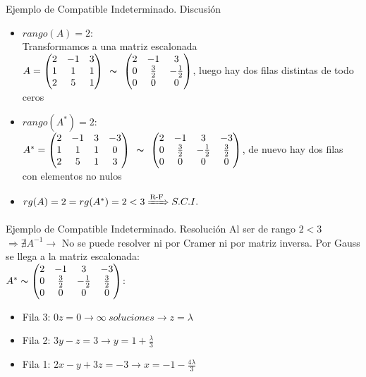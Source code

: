 \documentclass[11pt]{beamer}
\begin{document}
\begin{frame}{Ejemplo de Compatible Indeterminado. Discusión}
\begin{itemize}[<+->]
    \item $rango(A) =2$: \\ Transformamos a una matriz escalonada \\
    $A=\left(\begin{matrix}2 & -1 & 3\\1 & 1 & 1\\2 & 5 & 1\end{matrix}\right) \begin{array}{c}
     \thicksim   \\
     \end{array}
 \left(\begin{matrix}2 & -1 & 3\\0 & \frac{3}{2} & - \frac{1}{2}\\0 & 0 & 0\end{matrix}\right) $, luego hay dos filas distintas de todo ceros
    \item $rango(A^*) =2$: \\
    $A^*=\left(\begin{matrix}2 & -1 & 3 & -3\\1 & 1 & 1 & 0\\2 & 5 & 1 & 3\end{matrix}\right)\begin{array}{c}
     \thicksim   \\
    \end{array}
    \left(\begin{matrix}2 & -1 & 3 & -3\\0 & \frac{3}{2} & - \frac{1}{2} & \frac{3}{2}\\0 & 0 & 0 & 0\end{matrix}\right)$, de nuevo hay dos filas con elementos no nulos 
    \item $rg(A)=2 = rg(A^*)=2 < 3 \xRightarrow{\text{R-F}} S.C.I. $
\end{itemize}
    
\end{frame}

\begin{frame}{Ejemplo de Compatible Indeterminado. Resolución}
    Al ser de rango $2 < 3$ $\Rightarrow \nexists A^{-1} \to$ No se puede resolver ni por Cramer ni por matriz inversa.
Por Gauss se llega a la matriz escalonada: \\ $A^* \thicksim \left(\begin{matrix}2 & -1 & 3 & -3\\0 & \frac{3}{2} & - \frac{1}{2} & \frac{3}{2}\\0 & 0 & 0 & 0\end{matrix}\right)$:

\begin{itemize}[<+->]
    \item Fila 3: $0z=0 \to \infty  \ soluciones \to z = \lambda$
    \item Fila 2: $3y-z=3 \to y= 1+\frac{\lambda}{3}$
    \item Fila 1: $2x-y+3z=-3 \to x= -1 - \frac{4\lambda}{3} $
\end{itemize}
\end{frame}
\end{document}

